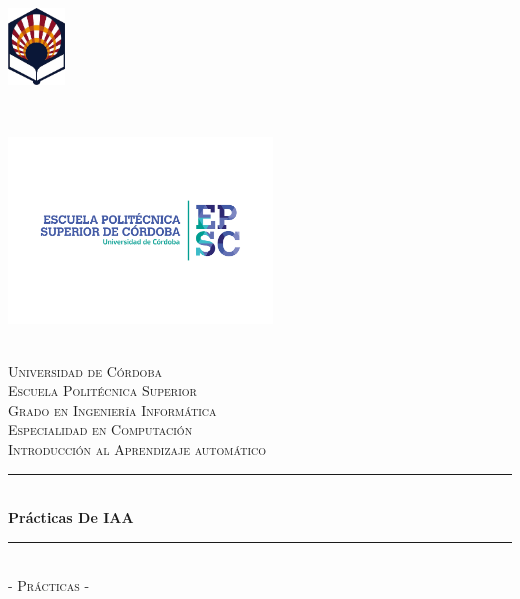 \begin{titlepage}
	\begin{center}
		\begin{minipage}{5cm}
            \begin{flushleft}
                \includegraphics[width=1.5cm]{./img/logo_uco_sin_texto.png}
            \end{flushleft}
        \end{minipage}
        ~
        \begin{minipage}{7cm}
            \begin{flushright}
              \includegraphics[width=7cm]{img/logo_uco_epsc.png}
            \end{flushright}
        \end{minipage}\\[0.2cm]
		
		{\huge\scshape Universidad de Córdoba} \\[0.15cm]
		{\huge\scshape Escuela Politécnica Superior} \\[1cm]
		
		{\Large\scshape Grado en Ingeniería Informática} \\[0.15cm]
		{\Large\scshape Especialidad en Computación} \\[0.5cm]
		{\large\scshape Introducción al Aprendizaje automático} \\
		
		\rule{\textwidth}{0.04cm} \\[0.3cm]
		{\huge\bfseries Prácticas De IAA} \\
		\rule{\textwidth}{0.04cm} \\[0.25cm]
		
		{\large\scshape - Prácticas -} \\[1cm]
		

\end{center}
\end{titlepage}
